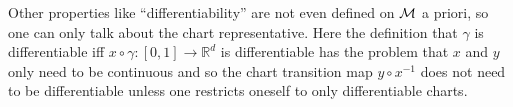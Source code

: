\documentclass[11pt, a4paper, twocolumn]{article} %
\begin{document}
Other properties like ``differentiability'' are not even defined on $\mathcal{M}$ a priori,
so one can only talk about the chart representative. Here the definition that $\gamma$
is differentiable iff $x\circ\gamma: [0,1]\to\mathbb{R}^{d}$ is differentiable has the
problem that $x$ and $y$ only need to be continuous and so the chart transition map
$y\circ x^{-1}$ does not need to be differentiable unless one restricts oneself to only
differentiable charts.



\printbibliography[title={Bibliography}] %

\end{document}
